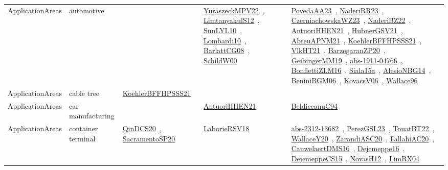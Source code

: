 {\begin{longtable}{lp{3cm}>{\raggedright\arraybackslash}p{6cm}>{\raggedright\arraybackslash}p{6cm}>{\raggedright\arraybackslash}p{8cm}}
ApplicationAreas & automotive &  & \href{works/YuraszeckMPV22.pdf}{YuraszeckMPV22}~\cite{YuraszeckMPV22}, \href{works/LimtanyakulS12.pdf}{LimtanyakulS12}~\cite{LimtanyakulS12}, \href{works/SunLYL10.pdf}{SunLYL10}~\cite{SunLYL10}, \href{works/Lombardi10.pdf}{Lombardi10}~\cite{Lombardi10}, \href{works/BarlattCG08.pdf}{BarlattCG08}~\cite{BarlattCG08}, \href{works/SchildW00.pdf}{SchildW00}~\cite{SchildW00} & \href{works/PovedaAA23.pdf}{PovedaAA23}~\cite{PovedaAA23}, \href{works/NaderiRR23.pdf}{NaderiRR23}~\cite{NaderiRR23}, \href{works/CzerniachowskaWZ23.pdf}{CzerniachowskaWZ23}~\cite{CzerniachowskaWZ23}, \href{works/NaderiBZ22.pdf}{NaderiBZ22}~\cite{NaderiBZ22}, \href{works/AntuoriHHEN21.pdf}{AntuoriHHEN21}~\cite{AntuoriHHEN21}, \href{works/HubnerGSV21.pdf}{HubnerGSV21}~\cite{HubnerGSV21}, \href{works/AbreuAPNM21.pdf}{AbreuAPNM21}~\cite{AbreuAPNM21}, \href{works/KoehlerBFFHPSSS21.pdf}{KoehlerBFFHPSSS21}~\cite{KoehlerBFFHPSSS21}, \href{works/VlkHT21.pdf}{VlkHT21}~\cite{VlkHT21}, \href{works/BarzegaranZP20.pdf}{BarzegaranZP20}~\cite{BarzegaranZP20}, \href{works/GeibingerMM19.pdf}{GeibingerMM19}~\cite{GeibingerMM19}, \href{works/abs-1911-04766.pdf}{abs-1911-04766}~\cite{abs-1911-04766}, \href{works/BonfiettiZLM16.pdf}{BonfiettiZLM16}~\cite{BonfiettiZLM16}, \href{works/Siala15a.pdf}{Siala15a}~\cite{Siala15a}, \href{works/AlesioNBG14.pdf}{AlesioNBG14}~\cite{AlesioNBG14}, \href{works/BeniniBGM06.pdf}{BeniniBGM06}~\cite{BeniniBGM06}, \href{works/KovacsV06.pdf}{KovacsV06}~\cite{KovacsV06}, \href{works/Wallace96.pdf}{Wallace96}~\cite{Wallace96}\\
ApplicationAreas & cable tree & \href{works/KoehlerBFFHPSSS21.pdf}{KoehlerBFFHPSSS21}~\cite{KoehlerBFFHPSSS21} &  & \\
ApplicationAreas & car manufacturing &  & \href{works/AntuoriHHEN21.pdf}{AntuoriHHEN21}~\cite{AntuoriHHEN21} & \href{works/BeldiceanuC94.pdf}{BeldiceanuC94}~\cite{BeldiceanuC94}\\
ApplicationAreas & container terminal & \href{works/QinDCS20.pdf}{QinDCS20}~\cite{QinDCS20}, \href{works/SacramentoSP20.pdf}{SacramentoSP20}~\cite{SacramentoSP20} & \href{works/LaborieRSV18.pdf}{LaborieRSV18}~\cite{LaborieRSV18} & \href{works/abs-2312-13682.pdf}{abs-2312-13682}~\cite{abs-2312-13682}, \href{works/PerezGSL23.pdf}{PerezGSL23}~\cite{PerezGSL23}, \href{works/TouatBT22.pdf}{TouatBT22}~\cite{TouatBT22}, \href{works/WallaceY20.pdf}{WallaceY20}~\cite{WallaceY20}, \href{works/ZarandiASC20.pdf}{ZarandiASC20}~\cite{ZarandiASC20}, \href{works/FallahiAC20.pdf}{FallahiAC20}~\cite{FallahiAC20}, \href{works/CauwelaertDMS16.pdf}{CauwelaertDMS16}~\cite{CauwelaertDMS16}, \href{works/Dejemeppe16.pdf}{Dejemeppe16}~\cite{Dejemeppe16}, \href{works/DejemeppeCS15.pdf}{DejemeppeCS15}~\cite{DejemeppeCS15}, \href{works/NovasH12.pdf}{NovasH12}~\cite{NovasH12}, \href{works/LimRX04.pdf}{LimRX04}~\cite{LimRX04}\\

\end{longtable}}
